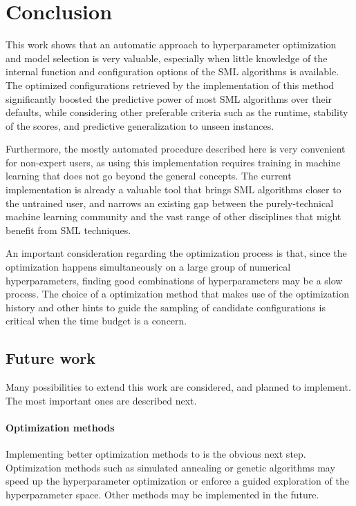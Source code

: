 \chapter{Conclusion}

This work shows that an automatic approach to hyperparameter optimization and model selection is
very valuable, especially when little knowledge of the internal function and configuration options of
the SML algorithms is
available. The optimized configurations retrieved by the implementation of this method significantly
boosted the predictive power of most SML algorithms over their defaults, while considering other
preferable criteria such as the runtime, stability of the scores, and predictive generalization to unseen
instances.

Furthermore, the mostly automated procedure described here is very convenient for non-expert users,
as using this implementation requires training in machine learning that does not go
beyond the general concepts. The current implementation is already a valuable tool that brings SML
algorithms closer to the untrained user, and narrows an existing gap between the purely-technical
machine learning community and the vast range of other disciplines that might benefit from SML
techniques.

An important consideration regarding the optimization process is that, since the optimization
happens simultaneously on a large group of numerical hyperparameters, finding good combinations of
hyperparameters may be a slow process. The choice of a optimization method that makes use of the
optimization history and other hints to guide the sampling of candidate configurations is critical
when the time budget is a concern.

\section{Future work}
	Many possibilities to extend this work are considered, and planned to implement. The most important ones are
	described next.

	\subsubsection{Optimization methods}
	Implementing better optimization methods to is the obvious next step. Optimization methods such
	as simulated annealing or genetic algorithms may speed up the hyperparameter optimization or
	enforce a guided exploration of the hyperparameter space. Other methods may be implemented in
	the future.

